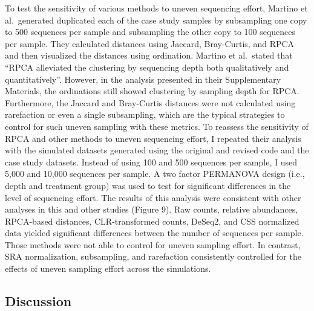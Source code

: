 \documentclass[
  11pt,
]{article}
\begin{document}
To test the sensitivity of various methods to uneven sequencing effort,
Martino et al.~generated duplicated each of the case study samples by
subsampling one copy to 500 sequences per sample and subsampling the
other copy to 100 sequences per sample. They calculated distances using
Jaccard, Bray-Curtis, and RPCA and then visualized the distances using
ordination. Martino et al.~stated that ``RPCA alleviated the clustering
by sequencing depth both qualitatively and quantitatively''. However, in
the analysis presented in their Supplementary Materials, the ordinations
still showed clustering by sampling depth for RPCA. Furthermore, the
Jaccard and Bray-Curtis distances were not calculated using rarefaction
or even a single subsampling, which are the typical strategies to
control for such uneven sampling with these metrics. To reassess the
sensitivity of RPCA and other methods to uneven sequencing effort, I
repeated their analysis with the simulated datasets generated using the
original and revised code and the case study datasets. Instead of using
100 and 500 sequences per sample, I used 5,000 and 10,000 sequences per
sample. A two factor PERMANOVA design (i.e., depth and treatment group)
was used to test for significant differences in the level of sequencing
effort. The results of this analysis were consistent with other analyses
in this and other studies (Figure 9). Raw counts, relative abundances,
RPCA-based distances, CLR-transformed counts, DeSeq2, and CSS normalized
data yielded significant differences between the number of sequences per
sample. Those methods were not able to control for uneven sampling
effort. In contrast, SRA normalization, subsampling, and rarefaction
consistently controlled for the effects of uneven sampling effort across
the simulations.

\subsection{Discussion}\label{discussion}
\end{document}
